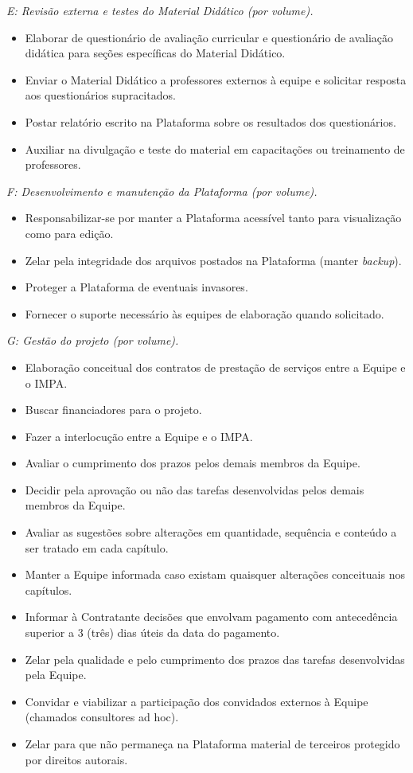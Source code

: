 \documentclass[10 pt]{article}
\begin{document}
{\it E: Revisão externa e testes do Material Didático (por volume).}
\begin{itemize} %
  \item     Elaborar de questionário de avaliação curricular e questionário de avaliação didática para seções específicas do Material Didático. 
  \item     Enviar o Material Didático a professores externos à equipe e solicitar resposta aos questionários supracitados.
  \item     Postar relatório escrito na Plataforma sobre os resultados dos questionários.
  \item     Auxiliar na divulgação e teste do material em capacitações ou treinamento de professores.
\end{itemize} %
\vspace{0.2cm}

{\it F: Desenvolvimento e manutenção da Plataforma (por volume).}
\begin{itemize} %
  \item     Responsabilizar-se por manter a Plataforma acessível tanto para visualização como para edição.
  \item     Zelar pela integridade dos arquivos postados na Plataforma (manter {\it backup}).
  \item     Proteger a Plataforma de eventuais invasores.
  \item     Fornecer o suporte necessário às equipes de elaboração quando solicitado.
\end{itemize} %
\vspace{0.2cm}

{\it G: Gestão do projeto (por volume).}
\begin{itemize} %
  \item     Elaboração conceitual dos contratos de prestação de serviços entre a Equipe e o IMPA.
  \item     Buscar financiadores para o projeto.
  \item     Fazer a interlocução entre a Equipe e o IMPA. 
  \item     Avaliar o cumprimento dos prazos pelos demais membros da Equipe.
  \item     Decidir pela aprovação ou não das tarefas desenvolvidas pelos demais membros da Equipe.
  \item     Avaliar as sugestões sobre alterações em quantidade, sequência e conteúdo a ser tratado em cada capítulo.
  \item     Manter a Equipe informada caso existam quaisquer alterações conceituais nos capítulos.
  \item     Informar à Contratante decisões que envolvam pagamento com antecedência superior a 3 (três) dias úteis da data do pagamento.
  \item     Zelar pela qualidade e pelo cumprimento dos prazos das tarefas desenvolvidas pela Equipe.
  \item     Convidar e viabilizar a participação dos convidados externos à Equipe (chamados consultores ad hoc).
  \item     Zelar para que não permaneça na Plataforma material de terceiros protegido por direitos autorais.
\end{itemize} %
\end{document}
